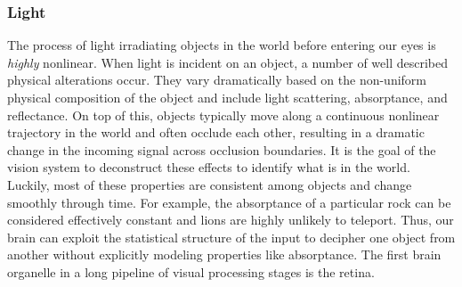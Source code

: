 \subsubsection{Light} The process of light irradiating objects in the world before entering our eyes is \textit{highly} nonlinear. When light is incident on an object, a number of well described physical alterations occur. They vary dramatically based on the non-uniform physical composition of the object and include light scattering, absorptance, and reflectance. On top of this, objects typically move along a continuous nonlinear trajectory in the world and often occlude each other, resulting in a dramatic change in the incoming signal across occlusion boundaries. It is the goal of the vision system to deconstruct these effects to identify what is in the world. Luckily, most of these properties are consistent among objects and change smoothly through time. For example, the absorptance of a particular rock can be considered effectively constant and lions are highly unlikely to teleport. Thus, our brain can exploit the statistical structure of the input to decipher one object from another without explicitly modeling properties like absorptance. The first brain organelle in a long pipeline of visual processing stages is the retina.

